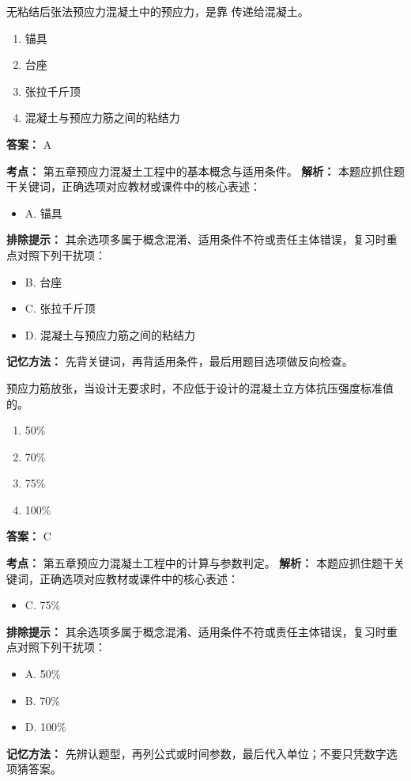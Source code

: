 \documentclass[UTF8,fontset=fandol,11pt]{ctexart}
\begin{document}
\begin{quizbox}[title={第 1 题}]
无粘结后张法预应力混凝土中的预应力，是靠 传递给混凝土。\\
\begin{enumerate}[label=\Alph*.]
\item 锚具
\item 台座
\item 张拉千斤顶
\item 混凝土与预应力筋之间的粘结力
\end{enumerate}
\textbf{答案：} A
\vspace{0.25em}
\begin{answerbox}[title={考点解析}]
\textbf{考点：} 第五章预应力混凝土工程中的基本概念与适用条件。
\textbf{解析：} 本题应抓住题干关键词，正确选项对应教材或课件中的核心表述：
\begin{itemize}
\item A. 锚具
\end{itemize}
\textbf{排除提示：} 其余选项多属于概念混淆、适用条件不符或责任主体错误，复习时重点对照下列干扰项：
\begin{itemize}
\item B. 台座
\item C. 张拉千斤顶
\item D. 混凝土与预应力筋之间的粘结力
\end{itemize}
\textbf{记忆方法：} 先背关键词，再背适用条件，最后用题目选项做反向检查。
\end{answerbox}
\end{quizbox}

\vspace{0.2em}

\begin{quizbox}[title={第 2 题}]
预应力筋放张，当设计无要求时，不应低于设计的混凝土立方体抗压强度标准值的。\\
\begin{enumerate}[label=\Alph*.]
\item 50\%
\item 70\%
\item 75\%
\item 100\%
\end{enumerate}
\textbf{答案：} C
\vspace{0.25em}
\begin{answerbox}[title={考点解析}]
\textbf{考点：} 第五章预应力混凝土工程中的计算与参数判定。
\textbf{解析：} 本题应抓住题干关键词，正确选项对应教材或课件中的核心表述：
\begin{itemize}
\item C. 75\%
\end{itemize}
\textbf{排除提示：} 其余选项多属于概念混淆、适用条件不符或责任主体错误，复习时重点对照下列干扰项：
\begin{itemize}
\item A. 50\%
\item B. 70\%
\item D. 100\%
\end{itemize}
\textbf{记忆方法：} 先辨认题型，再列公式或时间参数，最后代入单位；不要只凭数字选项猜答案。
\end{answerbox}
\end{quizbox}
\end{document}
